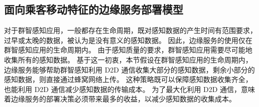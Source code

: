 \begin{table}[!t]
\begin{tabular}{|c|p{10.5cm}|}
  \end{tabular}
\end{table}

\subsection{面向乘客移动特征的边缘服务部署模型}

对于群智感知应用，一般都存在生命周期，既对感知数据的产生时间有范围要求，过早或太晚的数据，被认为是没有意义的感知数据。
因此，边缘服务的使用仅在群智感知应用的生命周期内。
由于感知质量的要求，群智感知应用需要尽可能地收集所有的感知数据。
基于这一初衷，本节假设在群智感知应用的生命周期内，边缘服务能够帮助群智感知利用 D2D 通信收集大部分的感知数据，剩余小部分的感知数据，则直接通过蜂窝网络上传。
这种策略既可以保障感知数据收集齐全，也能利用 D2D 通信减少感知数据的传输成本。
为了最大化利用 D2D 通信，意味着边缘服务的部署决策必须带来最多的收益，以减少感知数据的收集成本。

